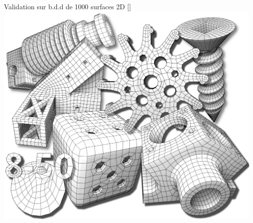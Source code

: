 \begin{frame}{Validation sur b.d.d de 1000 surfaces 2D [\cite{koch_abc_2019}]}
    \centering
    \includegraphics[width=.7\linewidth]{img/quantiz/dataset.png}
\end{frame}
